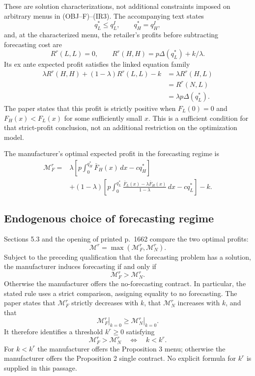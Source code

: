 \documentclass{article}
\begin{document}
These are solution characterizations, not additional constraints imposed on arbitrary menus in (OBJ--F)--(IR3). The accompanying text states
\[
q_L^*\leq q_L^I,\qquad q_H^*=q_H^I,
\]
and, at the characterized menu, the retailer's profits before subtracting forecasting cost are
\[
R^r(L,L)=0,\qquad R^r(H,H)=p\Delta(q_L^*)+k/\lambda.
\]
Its ex ante expected profit satisfies the linked equation family
\begin{align}
\lambda R^r(H,H)+(1-\lambda)R^r(L,L)-k
 &=\lambda R^r(H,L)\tag{2}\\
 &=R^r(N,L)\tag{3}\\
 &=\lambda p\Delta(q_L^*).\tag{4}
\end{align}
The paper states that this profit is strictly positive when $F_L(0)=0$ and $F_H(x)<F_L(x)$ for some sufficiently small $x$. This is a sufficient condition for that strict-profit conclusion, not an additional restriction on the optimization model.

The manufacturer's optimal expected profit in the forecasting regime is
\begin{equation}
\begin{split}
\mathcal M_F^r={}&\lambda\left[
 p\int_0^{q_H^*}\bar F_H(x)\,dx-cq_H^*\right]\\
&+(1-\lambda)\left[
 p\int_0^{q_L^*}\frac{\bar F_L(x)-\lambda\bar F_H(x)}{1-\lambda}\,dx
 -cq_L^*\right]-k.
\end{split}
\tag{5}
\end{equation}

\subsection*{Endogenous choice of forecasting regime}
Sections 5.3 and the opening of printed p.~1662 compare the two optimal profits:
\[
\mathcal M^r=\max(\mathcal M_F^r,\mathcal M_N^r).
\]
Subject to the preceding qualification that the forecasting problem has a solution, the manufacturer induces forecasting if and only if
\[
\mathcal M_F^r>\mathcal M_N^r.
\]
Otherwise the manufacturer offers the no-forecasting contract. In particular, the stated rule uses a strict comparison, assigning equality to no forecasting. The paper states that $\mathcal M_F^r$ strictly decreases with $k$, that $\mathcal M_N^r$ increases with $k$, and that
\[
\left.\mathcal M_F^r\right|_{k=0}
 \geq \left.\mathcal M_N^r\right|_{k=0}.
\]
It therefore identifies a threshold $k^r\geq0$ satisfying
\[
\mathcal M_F^r>\mathcal M_N^r
\quad\Longleftrightarrow\quad k<k^r.
\]
For $k<k^r$ the manufacturer offers the Proposition 3 menu; otherwise the manufacturer offers the Proposition 2 single contract. No explicit formula for $k^r$ is supplied in this passage.
\end{document}
